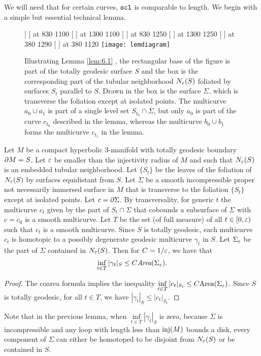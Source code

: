 We will need that for certain curves, $\operatorname{{\tt{scl}}}$ is comparable to length. We begin with a simple but essential technical lemma.
\begin{figure}[H]
\small\hair 2pt
  [ ] at 830 1100
  [ ] at 1300 1100
  [ ] at 830 1250
  [ ] at 1300 1250
  [ ] at 380 1290
  [ ] at 380 1120
\endlabellist
\centering
\texttt{[image: lemdiagram]}
\caption{ Illustrating Lemma \ref{lem:6.1} , the rectangular base of the figure is part of the totally geodesic surface $S$ and the box is the corresponding part of the tubular neighborhood $N_\varepsilon(S)$ foliated by surfaces $S_t$ parallel to $S$. Drawn in the box is the surface $\Sigma$, which is transverse the foliation except at isolated points. The multicurve $a_0\cup a_1$ is part of a single level set $S_{t_0} \cap \Sigma$, but only $a_0$ is part of the curve $c_{t_0}$ described in the lemma, whereas the multicurve $b_0\cup b_1$ forms the multicurve $c_{t_1}$ in the lemma.}
\label{fig:box}
\end{figure}


\begin{lem} \label{lem:6.1} Let $M$ be a compact hyperbolic 3-manifold with totally geodesic boundary $ \partial M = S$. Let $\varepsilon$ be smaller than the injectivity radius of $M$ and such that $N_\varepsilon(S)$ is an embedded tubular neighborhood. Let $\{S_t\}$ be the leaves of the foliation of $N_\varepsilon(S)$ by surfaces equidistant from $S$.  Let $\Sigma$ be a smooth incompressible proper not necessarily immersed surface in $M$ that is transverse to the foliation $\{S_t\}$ except at isolated points. Let $c = \partial \Sigma$. By transversality, for generic $t$ the multicurve $c_t$ given by the part of $S_t\cap \Sigma$ that cobounds a subsurface of $\Sigma$ with $c = c_0$ is a smooth multicurve.  Let $T$ be the set (of full measure) of all $t\in[0,\varepsilon)$ such that $c_t$ is a smooth multicurve. Since $S$ is totally geodesic, each multicurve $c_t$ is homotopic to a possibly degenerate geodesic multicurve $\gamma_t$ in $S$. Let $\Sigma_\varepsilon$ be the part of $\Sigma$ contained in $N_\varepsilon(S)$. Then for $C = 1/\varepsilon$, we have that $$\inf\limits_{t\in T} |\gamma_t|_{S} \leq C \emph{Area}(\Sigma_\varepsilon).$$
\end{lem}

\begin{proof} The coarea formula implies the inequality $\inf\limits_{t\in T} |c_t|_{S_t} \leq C \text{Area}(\Sigma_\varepsilon)$.  Since $S$ is totally geodesic, for all $t\in T$, we have $|\gamma_t|_S\leq |c_t|_{S_t}.$  \end{proof}
Note that in the previous lemma, when $\inf\limits_{t\in T} |\gamma_t|_S$ is zero, because $\Sigma$ is incompressible and any loop with length less than $\operatorname{inj}(M)$ bounds a disk, every component of $\Sigma$ can either be homotoped to be disjoint from $N_\varepsilon(S)$ or be contained in $S$.

